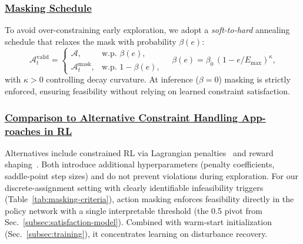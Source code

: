 \documentclass[12pt,lettersize,journal,onecolumn]{IEEEtran}
\begin{document}
\subsubsection{\underline{Masking Schedule}}
To avoid over-constraining early exploration, we adopt a \textit{soft-to-hard} annealing schedule that relaxes the mask with probability $\beta(e)$:
$$
\mathcal{A}^{\text{valid}}_t =
\begin{cases}
\mathcal{A}, & \text{w.p. } \beta(e),\\
\mathcal{A}^{\text{mask}}_t, & \text{w.p. } 1-\beta(e),
\end{cases}
\quad \beta(e) = \beta_0\,(1-e/E_{\text{max}})^{\kappa},
$$
with $\kappa>0$ controlling decay curvature. At inference ($\beta=0$) masking is strictly enforced, ensuring feasibility without relying on learned constraint satisfaction.

\subsubsection{\uline{Comparison to Alternative Constraint Handling App- roaches in RL}} %
Alternatives include constrained RL via Lagrangian penalties~\cite{jsac24zangooei} and reward shaping~\cite{tnse25nouruzi}. Both introduce additional hyperparameters (penalty coefficients, saddle-point step sizes) and do not prevent violations during exploration. For our discrete-assignment setting with clearly identifiable infeasibility triggers (Table~\ref{tab:masking-criteria}), action masking enforces feasibility directly in the policy network with a single interpretable threshold (the 0.5 pivot from Sec.~\ref{subsec:satisfaction-model}). Combined with warm-start initialization (Sec.~\ref{subsec:training}), it concentrates learning on disturbance recovery. %
\end{document}
